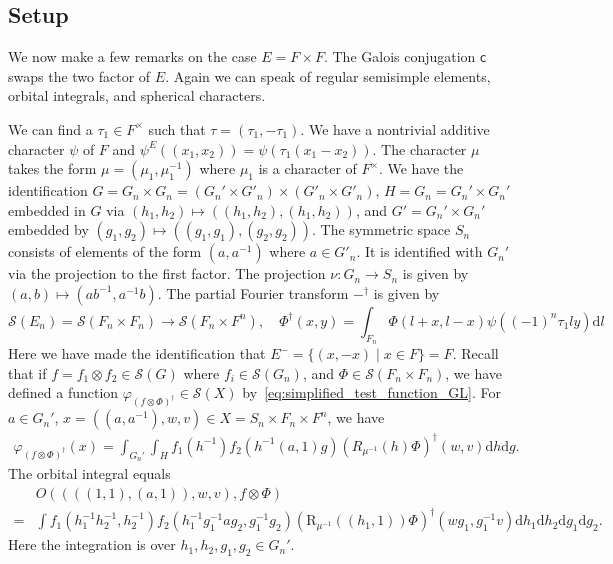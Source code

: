 \documentclass[letterpaper,11pt]{amsart}
\newcommand{\cS}{\mathcal{S}}
\newcommand{\rd}{\mathrm{d}}
\newcommand{\<}{\negthickspace}
\theoremstyle{definition}
\theoremstyle{plain}
\theoremstyle{remark}
\numberwithin{equation}{section}
\begin{document}
\subsection{Setup}
We now make a few remarks on the case $E = F \times F$. The Galois conjugation
$\mathsf{c}$ swaps the two factor of $E$. Again
we can speak of regular semisimple elements, orbital integrals, and
spherical characters.

We can find a $\tau_1 \in F^\times$ such that $\tau = (\tau_1, -\tau_1)$. We
have a nontrivial additive character $\psi$ of $F$ and $\psi^{E}((x_1, x_2))
= \psi(\tau_1(x_1 -x_2))$. The character $\mu$ takes the form $\mu = (\mu_1,
\mu_1^{-1})$ where $\mu_1$ is a character of $F^\times$. We have the
identification $G = G_n \times G_n = (G_n' \times G'_n) \times (G'_n \times
G'_n)$, $H = G_n =  G_n' \times G_n'$ embedded in $G$ via $(h_1, h_2) \mapsto
((h_1, h_2), (h_1, h_2))$, and $G' = G_n' \times G_n'$ embedded by $(g_1, g_2)
\mapsto ((g_1, g_1), (g_2, g_2))$. The symmetric space $S_n$ consists of
elements of the form $(a, a^{-1})$ where $a \in G'_n$. It is identified with
$G_n'$ via the projection to the first factor. The projection $\nu : G_n
\to S_n$ is given by $(a,b) \mapsto (ab^{-1},a^{-1}b)$.
The partial Fourier transform
$-^\dag$ is given by
    \[
    \cS(E_{n}) = \cS(F_n \times F_n) \to \cS(F_{n} \times F^n), \quad
    \Phi^\dag(x, y) = \int_{F_n} \Phi(l+x, l-x)
    \psi((-1)^n \tau_1 ly) \rd l
    \]
Here we have made the identification that $E^- = \{(x, -x) \mid x\in F\} =
F$. Recall that if $f = f_1 \otimes f_2 \in \cS(G)$ where $f_i \in \cS(G_n)$,
and $\Phi \in \cS(F_n \times F_n)$, we have defined a function $\varphi_{(f
\otimes \Phi)^\dag} \in \cS(X)$ by~\eqref{eq:simplified_test_function_GL}.
For $a \in G_n'$, $x = ((a, a^{-1}), w, v) \in X = S_n \times F_{n} \times
F^n$, we have
    \begin{equation}
    \begin{aligned}
    \varphi_{(f \otimes \Phi)^\dag}(x) =
     \int_{G_n'} \int_{H}
    f_1(h^{-1}) f_2(h^{-1} (a, 1) g)
    (R_{\mu^{-1}}(h)\Phi)^\dag (w, v)
    \rd h \rd g.
    \end{aligned}
    \end{equation}
The orbital integral equals
    \begin{equation}    \label{eq:oi_gl_split}
    \begin{aligned}
    &O((((1, 1), (a, 1)), w, v), f \otimes \Phi) \\
    =
    & \int f_1(h_1^{-1} h_2^{-1}, h_2^{-1})
    f_2(h_1^{-1} g_1^{-1} a g_2, g_1^{-1} g_2)
    \left( \mathrm{R}_{\mu^{-1}}((h_1, 1)) \Phi\right)^\dag (wg_1, g_1^{-1} v)
    \rd h_1 \rd h_2 \rd g_1 \rd g_2.
    \end{aligned}
    \end{equation}
Here the integration is over $h_1, h_2, g_1, g_2 \in G_n'$.
\end{document}
